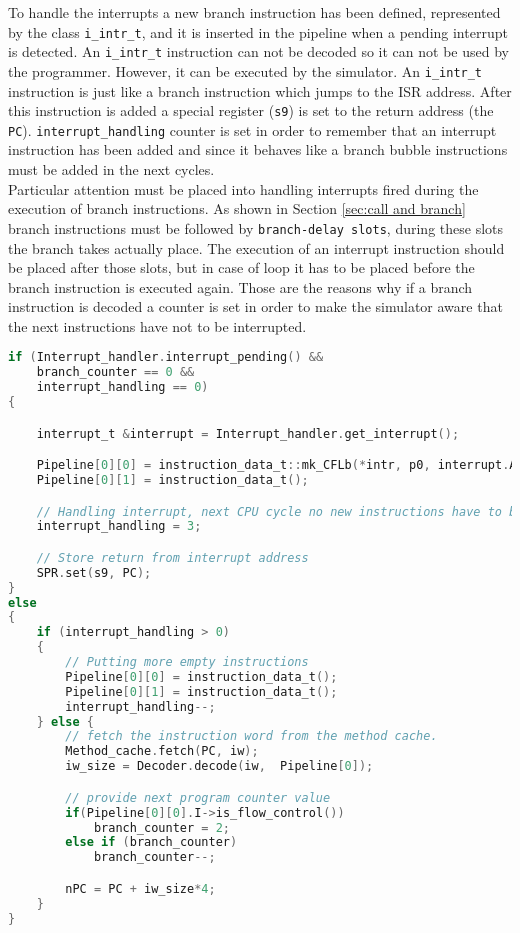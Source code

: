 To handle the interrupts a new branch instruction has been defined, represented by the class \texttt{i\_intr\_t}, and it is inserted in the pipeline when a pending interrupt is detected. An \texttt{i\_intr\_t} instruction can not be decoded so it can not be used by the programmer. However, it can be executed by the simulator. An \texttt{i\_intr\_t} instruction is just like a branch instruction which jumps to the ISR address. After this instruction is added a special register (\texttt{s9}) is set to the return address (the \texttt{PC}). \texttt{interrupt\_handling} counter is set in order to remember that an interrupt instruction has been added and since it behaves like a branch bubble instructions must be added in the next cycles.\\

Particular attention must be placed into handling interrupts fired during the execution of branch instructions. As shown in Section \ref{sec:call and branch} branch instructions must be followed by \texttt{branch-delay slots}, during these slots the branch takes actually place. The execution of an interrupt instruction should be placed after those slots, but in case of loop it has to be placed before the branch instruction is executed again. Those are the reasons why if a branch instruction is decoded a counter is set in order to make the simulator aware that the next instructions have not to be interrupted.

\begin{lstlisting}[language=C, caption=Interrupt handling code added to the simulator main cycle, label=lst:interrupt_handling]
if (Interrupt_handler.interrupt_pending() && 
	branch_counter == 0 && 
	interrupt_handling == 0) 
{ 

	interrupt_t &interrupt = Interrupt_handler.get_interrupt();

	Pipeline[0][0] = instruction_data_t::mk_CFLb(*intr, p0, interrupt.Address);
	Pipeline[0][1] = instruction_data_t();

	// Handling interrupt, next CPU cycle no new instructions have to be decoded
    interrupt_handling = 3;

    // Store return from interrupt address
    SPR.set(s9, PC);
}
else 
{
	if (interrupt_handling > 0) 
	{
		// Putting more empty instructions
		Pipeline[0][0] = instruction_data_t();
		Pipeline[0][1] = instruction_data_t();
		interrupt_handling--;
	} else {
		// fetch the instruction word from the method cache.
		Method_cache.fetch(PC, iw);
		iw_size = Decoder.decode(iw,  Pipeline[0]);

		// provide next program counter value
		if(Pipeline[0][0].I->is_flow_control())
			branch_counter = 2;
		else if (branch_counter)
			branch_counter--;

		nPC = PC + iw_size*4;
	}
}
\end{lstlisting}

